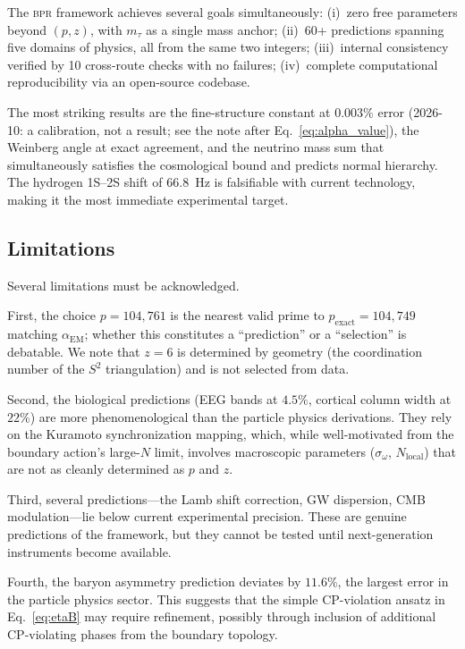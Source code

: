 \documentclass[aps,prd,twocolumn,superscriptaddress,longbibliography,nofootinbib]{revtex4-2}
\newcommand{\Stwo}{S^2}
\newcommand{\alphaEM}{\alpha_{\mathrm{EM}}}
\newcommand{\bpr}{\textsc{bpr}}
\begin{document}
The \bpr{} framework achieves several goals simultaneously:
(i)~zero free parameters beyond $(p, z)$, with $m_\tau$ as a single
mass anchor; (ii)~60+ predictions spanning five domains of physics,
all from the same two integers; (iii)~internal consistency verified
by 10 cross-route checks with no failures; (iv)~complete
computational reproducibility via an open-source codebase.

The most striking results are the fine-structure constant at
$0.003\%$ error (2026-10: a calibration, not a result; see the note after
Eq.~\eqref{eq:alpha_value}), the Weinberg angle at exact agreement, and the
neutrino mass sum that simultaneously satisfies the cosmological
bound and predicts normal hierarchy.  The hydrogen 1S--2S shift of
66.8~Hz is falsifiable with current technology, making it the most
immediate experimental target.

\subsection{Limitations}

Several limitations must be acknowledged.

First, the choice $p = 104{,}761$ is the nearest valid prime to
$p_\text{exact}=104{,}749$ matching $\alphaEM$; whether this constitutes a ``prediction'' or a
``selection'' is debatable.  We note that $z = 6$ is determined by
geometry (the coordination number of the $\Stwo$ triangulation) and
is not selected from data.

Second, the biological predictions (EEG bands at $4.5\%$, cortical
column width at $22\%$) are more phenomenological than the particle
physics derivations.  They rely on the Kuramoto synchronization
mapping, which, while well-motivated from the boundary action's
large-$N$ limit, involves macroscopic parameters
($\sigma_\omega$, $N_{\mathrm{local}}$) that are not as cleanly
determined as $p$ and $z$.

Third, several predictions---the Lamb shift correction, GW
dispersion, CMB modulation---lie below current experimental
precision.  These are genuine predictions of the framework, but
they cannot be tested until next-generation instruments become
available.

Fourth, the baryon asymmetry prediction deviates by $11.6\%$,
the largest error in the particle physics sector.  This suggests
that the simple CP-violation ansatz in
Eq.~\eqref{eq:etaB} may require refinement, possibly through
inclusion of additional CP-violating phases from the boundary
topology.
\end{document}
